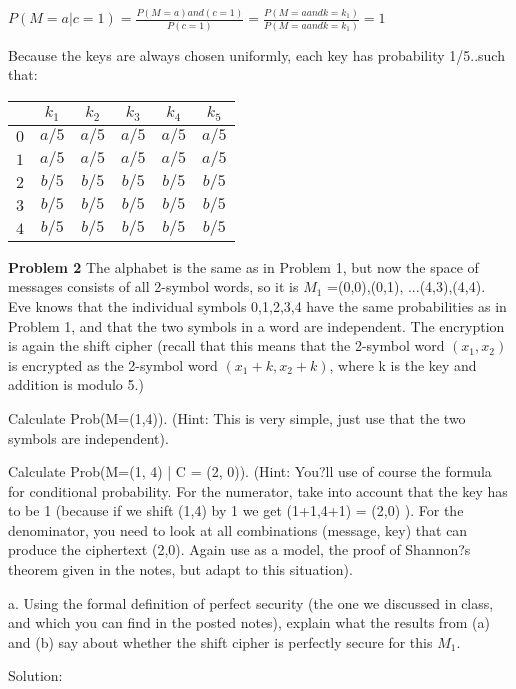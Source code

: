 \documentclass[12pt,letterpaper,final]{report}
\begin{document}
\bigskip $P (M = a | c = 1) = \frac{P(M=a) and  (c = 1)}{P (c = 1)} = \frac{P(M=a  and   k = k_{1})}{P (M = a and  k = k_{1})} = 1$

\bigskip Because the keys are always chosen uniformly, each key has probability 1/5..such that:  
\indent\begin{tabular}{|c|c|c|c|c|c|}
\hline
$ $ & $k_{1}$ & $k_{2}$ & $k_{3}$ & $k_{4}$ & $k_{5}$ \\
\hline
$0$ & $ a/5$ & $ a/5$ & $ a/5$ & $ a/5$ & $ a/5$ \\
$1$ & $ a/5$ & $ a/5$ & $ a/5$ & $ a/5$ & $ a/5$ \\
$2$ & $ b/5$ & $ b/5$ & $ b/5$ & $ b/5$ & $ b/5$ \\
$3$ & $ b/5$ & $ b/5$ & $ b/5$ & $ b/5$ & $ b/5$ \\
$4$ & $ b/5$ & $ b/5$ & $ b/5$ & $ b/5$ & $ b/5$ \\
\hline
\end{tabular}


\bigskip
\noindent\textbf{Problem 2} The alphabet is the same as in Problem 1, but now the space of messages consists of all 2-symbol words, so it is $M_{1}$ ={(0,0),(0,1), ...(4,3),(4,4)}. Eve knows that the individual symbols 0,1,2,3,4 have the same probabilities as in Problem 1, and that the two symbols in a word are independent. The encryption is again the shift cipher (recall that this means that the 2-symbol word
 $(x_{1}, x_{2})$ is encrypted as the 2-symbol word  $(x_{1}+k, x_{2}+k)$, where k is the key and addition is modulo 5.)

\bigskip
{}
\begin{alphalist}
	\item Calculate Prob(M=(1,4)). (Hint: This is very simple, just use that the two symbols are independent).
	\item Calculate Prob(M=(1, 4) | C = (2, 0)). (Hint: You?ll use of course the formula for conditional probability. For the numerator, take into account that the key has to be 1 (because if we shift (1,4) by 1 we get (1+1,4+1) = (2,0) ). For the denominator, you need to look at all combinations (message, key) that can produce the ciphertext (2,0).  Again use as a model, the proof of Shannon?s theorem given in the notes, but adapt to this situation).
	\item a.	Using the formal definition of perfect security (the one we discussed in class, and which you can find in the posted notes), explain what the results from (a) and (b) say about whether the shift cipher is perfectly secure for this $M_{1}$.
\end{alphalist}


\bigskip Solution: 
\bigskip
\end{document}

